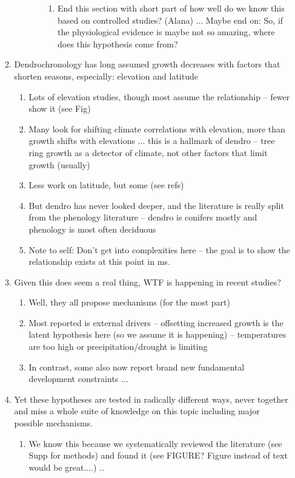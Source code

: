 \documentclass[11pt,letter]{article}
\begin{document}
\begin{enumerate}
\begin{enumerate}
\begin{enumerate}
\begin{enumerate}
\begin{enumerate}
\item End this section with short part of how well do we know this based on controlled studies? (Alana) ... Maybe end on: So, if the physiological evidence is maybe not so amazing, where does this hypothesis come from?
\end{enumerate}
\end{enumerate}
\end{enumerate}
\item Dendrochronology has long assumed growth decreases with factors that shorten seasons, especially: elevation and latitude
\begin{enumerate}
\item Lots of elevation studies, though most assume the relationship -- fewer show it (see Fig)
\item Many look for shifting climate correlations with elevation, more than growth shifts with elevations ... this is a hallmark of dendro -- tree ring growth as a detector of climate, not other factors that limit growth (usually) 
\item Less work on latitude, but some (see refs)
\item But dendro has never looked deeper, and the literature is really split from the phenology literature -- dendro is conifers mostly and phenology is most often deciduous
\item Note to self: Don't get into complexities here -- the goal is to show the relationship exists at this point in ms. 
\end{enumerate}
\item Given this does seem a real thing, WTF is happening in recent studies? 
\begin{enumerate}
\item Well, they all propose mechanisms (for the most part)
\item Most reported is external drivers --  offsetting increased growth is the latent hypothesis here (so we assume it is happening) -- temperatures are too high or precipitation/drought is limiting
\item In contrast, some also now report brand new fundamental development constraints ... 
\end{enumerate}
\item Yet these hypotheses are tested in radically different ways, never together and miss a whole suite of knowledge on this topic including major possible mechanisms. 
\begin{enumerate}
\item We know this because we systematically reviewed the literature (see Supp for methods) and found it (see FIGURE? Figure instead of text would be great....) .. 

\end{enumerate}
\end{enumerate}
\end{enumerate}
\end{document}
